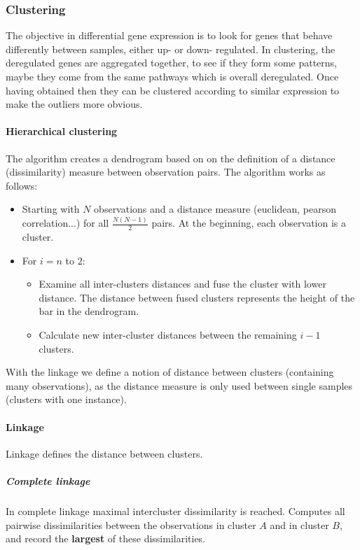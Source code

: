 		\subsubsection{Clustering}
		The objective in differential gene expression is to look for genes that behave differently between samples, either up- or down- regulated.
		In clustering, the deregulated genes are aggregated together, to see if they form some patterns, maybe they come from the same pathways which is overall deregulated.
		Once having obtained then they can be clustered according to similar expression to make the outliers more obvious.

			\paragraph{Hierarchical clustering}
			The algorithm creates a dendrogram based on on the definition of a distance (dissimilarity) measure between observation pairs.
			The algorithm works as follows:
			
				\begin{itemize}
					\item Starting with $N$ observations and a distance measure (euclidean, pearson correlation...) for all $\frac{N(N-1)}{2}$ pairs.
						At the beginning, each observation is a cluster.
					\item For $i =n$ to $2$:

						\begin{itemize}
							\item Examine all inter-clusters distances and fuse the cluster with 										lower distance.
								The distance between fused clusters represents the height of the 										bar in the dendrogram.
							\item Calculate new inter-cluster distances between the remaining 											$i-1$ clusters.
						\end{itemize}

				\end{itemize}
			
	With the linkage we define a notion of distance between clusters (containing many observations), as the distance measure is only used between single samples (clusters with one instance).
			\paragraph{Linkage}
			Linkage defines the distance between clusters.

				\subparagraph{Complete linkage}
				In complete linkage maximal intercluster dissimilarity is reached.
				Computes all pairwise dissimilarities between the observations in cluster $A$ and in cluster $B$, and record the \textbf{largest} of these dissimilarities.

